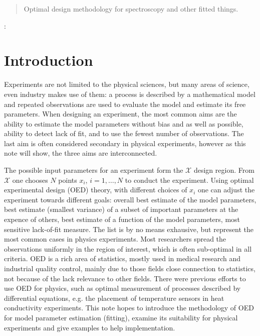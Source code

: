 \documentclass[12pt]{iopart}
\begin{document}
\address{Institute of Atomic and Molecular Sciences, Academia Sinica, Taiwan}
\begin{abstract}
Optimal design methodology for spectroscopy and other fitted things.
\end{abstract}

:

\pacs{}

\section{Introduction}

Experiments are not limited to the physical sciences, but many areas of science, even industry makes use of them: a process is described by a mathematical model and repeated observations are used to evaluate the model and estimate its free parameters. When designing an experiment, the most common aims are the ability to estimate the model parameters without bias and as well as possible, ability to detect lack of fit, and to use the fewest number of observations\cite{Box1975,Box1987}. The last aim is often considered secondary in physical experiments, however as this note will show, the three aims are interconnected. 

The possible input parameters for an experiment form the $\mathcal{X}$ design region. From $\mathcal{X}$ one chooses $N$ points $x_i$, $i = 1, \ldots, N$ to conduct the experiment. Using optimal experimental design (OED) theory, with different choices of $x_i$ one can adjust the experiment towards different goals: overall best estimate of the model parameters, best estimate (smallest variance) of a subset of important parameters at the expence of others, best estimate of a function of the model parameters, most sensitive lack-of-fit measure. The list is by no means exhausive, but represent the most common cases in physics experiments. Most researchers spread the observations uniformly in the region of interest, which is often sub-optimal in all criteria. OED is a rich area of statistics, mostly used in medical research and industrial quality control, mainly due to those fields close connection to statistics, not because of the lack relevance to other fields. There were previous efforts to use OED for physics, such as optimal measurement of processes described by differential equations, e.g. the placement of temperature sensors in heat conductivity experiments\cite{Emery1998}. This note hopes to introduce the methodology of OED for model parameter estimation (fitting), examine its suitability for physical experiments and give examples to help implementation.
\end{document}
